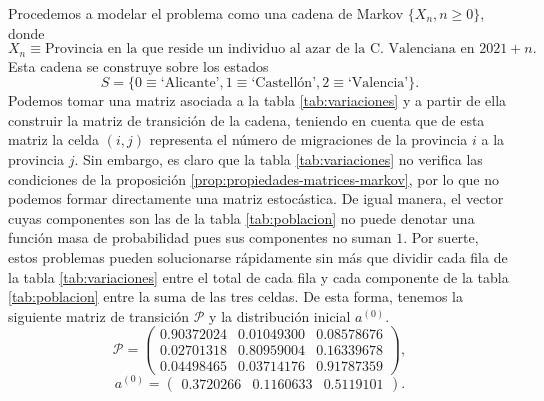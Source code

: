 \begin{ejemplo}
        Procedemos a modelar el problema como una cadena de Markov $\{X_n,n\geq0\}$, donde 
        $$X_n \equiv \text{Provincia en la que reside un individuo al azar de la C. Valenciana en }2021+n.$$ 
        Esta cadena se construye sobre los estados 
        $$
        S=\{0\equiv\text{`Alicante'}, 1\equiv\text{`Castellón'},2\equiv\text{`Valencia'}\}.
        $$
        Podemos tomar una matriz asociada a la tabla \ref{tab:variaciones} y a partir de ella construir la matriz de transición de la cadena, teniendo en cuenta que de esta matriz la celda $(i,j)$ representa el número de migraciones de la provincia $i$ a la provincia $j$. Sin embargo, es claro que la tabla \ref{tab:variaciones} no verifica las condiciones de la proposición \ref{prop:propiedades-matrices-markov}, por lo que no podemos formar directamente una matriz estocástica. De igual manera, el vector cuyas componentes son las de la tabla \ref{tab:poblacion} no puede denotar una función masa de probabilidad pues sus componentes no suman $1$. Por suerte, estos problemas pueden solucionarse rápidamente sin más que dividir cada fila de la tabla \ref{tab:variaciones} entre el total de cada fila y cada componente de la tabla \ref{tab:poblacion} entre la suma de las tres celdas. De esta forma, tenemos la siguiente matriz de transición $\mathcal P$ y la distribución inicial $a^{(0)}$.
        \begin{equation*}
            \label{eq:ejemplo-migraciones-matriz}
            \mathcal P = \begin{pmatrix}
                0.90372024 & 0.01049300 & 0.08578676 \\
                0.02701318 & 0.80959004 & 0.16339678 \\
                0.04498465 & 0.03714176 & 0.91787359
            \end{pmatrix}, 
        \end{equation*}
        \begin{equation*}
            a^{(0)} = \begin{pmatrix}
                0.3720266 &
                0.1160633 &
                0.5119101
            \end{pmatrix}.
        \end{equation*}
         

\end{ejemplo}
